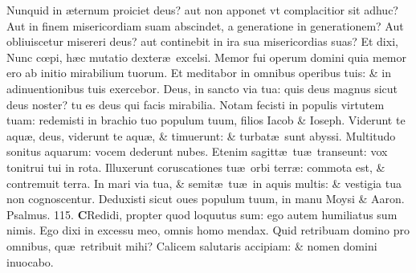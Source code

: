 \documentclass[a5paper,10pt]{book}
\def\ae{æ}
\def\oe{œ}
\begin{document}
\begin{multicols*}{2}
\newline \color{red} N\color{black}unquid in \ae ternum proiciet deus? aut non apponet vt complacitior sit adhuc?
\newline \color{red} A\color{black}ut in finem misericordiam suam abscindet, a generatione in generationem?
\newline \color{red} A\color{black}ut obliuiscetur misereri deus? aut continebit in ira sua misericordias suas?
\newline \color{red} E\color{black}t dixi, Nunc c\oe pi, h\ae c mutatio dexter\ae \ excelsi.
\newline \color{red} M\color{black}emor fui operum domini quia memor ero ab initio mirabilium tuorum.
\newline \color{red} E\color{black}t meditabor in omnibus operibus tuis: \& in adinuentionibus tuis exercebor.
\newline \color{red} D\color{black}eus, in sancto via tua: quis deus magnus sicut deus noster? tu es deus qui facis mirabilia.
\newline \color{red} N\color{black}otam fecisti in populis virtutem tuam: redemisti in brachio tuo populum tuum, filios Iacob \& Ioseph.
\newline \color{red} V\color{black}iderunt te aqu\ae , deus, viderunt te aqu\ae , \& timuerunt: \& turbat\ae \ sunt abyssi.
\newline \color{red} M\color{black}ultitudo sonitus aquarum: vocem dederunt nubes.
\newline \color{red} E\color{black}tenim sagitt\ae \ tu\ae \ transeunt: vox tonitrui tui in rota.
\newline \color{red} I\color{black}lluxerunt coruscationes tu\ae \ orbi terr\ae : commota est, \& contremuit terra.
\newline \color{red} I\color{black}n mari via tua, \& semit\ae \ tu\ae \ in aquis multis: \& vestigia tua non cognoscentur.
\newline \color{red} D\color{black}eduxisti sicut oues populum tuum, in manu Moysi \& Aaron. \color{red} Psalmus. \hypertarget{ps115}{115.} \color{black}
\vspace{-.5em}
\lettrine[lines=2]{\bfseries \color{red} C}{}Redidi, propter quod loquutus sum: ego autem humiliatus sum nimis.
\newline \color{red} E\color{black}go dixi in excessu meo, omnis homo mendax.
\newline \color{red} Q\color{black}uid retribuam domino pro omnibus, qu\ae \ retribuit mihi?
\newline \color{red} C\color{black}alicem salutaris accipiam: \& nomen domini inuocabo.

\end{multicols*}
\end{document}

